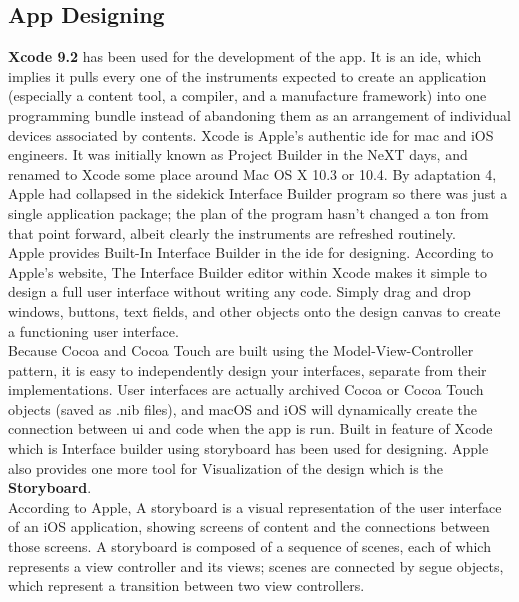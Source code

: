 \subsection{App Designing}

\textbf{Xcode 9.2} has been used for the development of the app. It is an \gls{ide}, which implies it pulls every one of the instruments expected to create an application (especially a content tool, a compiler, and a manufacture framework) into one programming bundle instead of abandoning them as an arrangement of individual devices associated by contents. Xcode is Apple's authentic \gls{ide} for \gls{mac} and \gls{iOS} engineers. It was initially known as Project Builder in the NeXT days, and renamed to Xcode some place around Mac OS X 10.3 or 10.4. By adaptation 4, Apple had collapsed in the sidekick Interface Builder program so there was just a single application package; the plan of the program hasn't changed a ton from that point forward, albeit clearly the instruments are refreshed routinely. \\


Apple provides Built-In Interface Builder in the \gls{ide} for designing.
According to Apple's website, The Interface Builder editor within Xcode makes it simple to design a full user interface without writing any code. Simply drag and drop windows, buttons, text fields, and other objects onto the design canvas to create a functioning user interface. \cite{Xcode} \\

Because Cocoa and Cocoa Touch are built using the Model-View-Controller pattern, it is easy to independently design your interfaces, separate from their implementations. User interfaces are actually archived Cocoa or Cocoa Touch objects (saved as .nib files), and \gls{macOS} and \gls{iOS} will dynamically create the connection between \gls{ui} and code when the app is run. Built in feature of Xcode which is Interface builder using storyboard has been used for designing. Apple also provides one more tool for Visualization of the design which is the \textbf{Storyboard}. \\

According to Apple, A storyboard is a visual representation of the user interface of an \gls{iOS} application, showing screens of content and the connections between those screens. A storyboard is composed of a sequence of scenes, each of which represents a view controller and its views; scenes are connected by segue objects, which represent a transition between two view controllers. \cite{Storyboard}  \\

